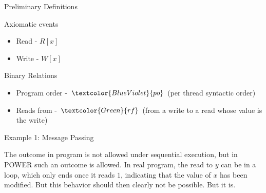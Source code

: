 \documentclass[notes, xcolor=dvipsnames]{beamer}
\newcommand{\po}{\textcolor{BlueViolet}{po}}
\newcommand{\rf}{\textcolor{Green}{rf}}
\begin{document}
    \begin{frame}{Preliminary Definitions}

        Axiomatic events 
        \begin{itemize}
            \item Read - $R[x]$
            \item Write - $W[x]$
        \end{itemize}

        Binary Relations 
        \begin{itemize}
            \item Program order - $\po$ (per thread syntactic order)
            \item Reads from - $\rf$ (from a write to a read whose value is the write)
        \end{itemize}
        
    \end{frame}

    \begin{frame}{Example 1: Message Passing}

        \begin{figure}
        \end{figure}

        The outcome in program is not allowed under sequential execution, but in POWER such an outcome is allowed.
        In real program, the read to $y$ can be in a loop, which only ends once it reads $1$, indicating that the value of $x$ has been modified.
        But this behavior should then clearly not be possible. But it is.

    \end{frame}
\end{document}
